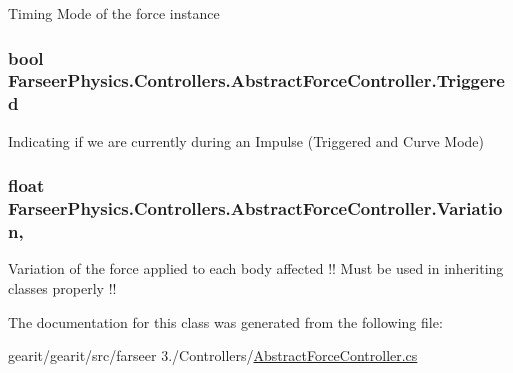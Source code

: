 Timing Mode of the force instance 

\hypertarget{class_farseer_physics_1_1_controllers_1_1_abstract_force_controller_a9c7e70cd8c1d2c48d265e81240e2b95b}{
\subsubsection[{Triggered}]{\setlength{\rightskip}{0pt plus 5cm}bool Farseer\+Physics.\+Controllers.\+Abstract\+Force\+Controller.\+Triggered\hspace{0.3cm}{\ttfamily [get]}}}\label{class_farseer_physics_1_1_controllers_1_1_abstract_force_controller_a9c7e70cd8c1d2c48d265e81240e2b95b}


Indicating if we are currently during an Impulse (Triggered and Curve Mode) 

\hypertarget{class_farseer_physics_1_1_controllers_1_1_abstract_force_controller_a57ebfe526add8959ba2e4e2ef586b829}{
\subsubsection[{Variation}]{\setlength{\rightskip}{0pt plus 5cm}float Farseer\+Physics.\+Controllers.\+Abstract\+Force\+Controller.\+Variation\hspace{0.3cm}{\ttfamily [get]}, {\ttfamily [set]}}}\label{class_farseer_physics_1_1_controllers_1_1_abstract_force_controller_a57ebfe526add8959ba2e4e2ef586b829}


Variation of the force applied to each body affected !! Must be used in inheriting classes properly !! 



The documentation for this class was generated from the following file\+:\begin{DoxyCompactItemize}
\item 
gearit/gearit/src/farseer 3./\+Controllers/\hyperlink{_abstract_force_controller_8cs}{Abstract\+Force\+Controller.\+cs}\end{DoxyCompactItemize}
